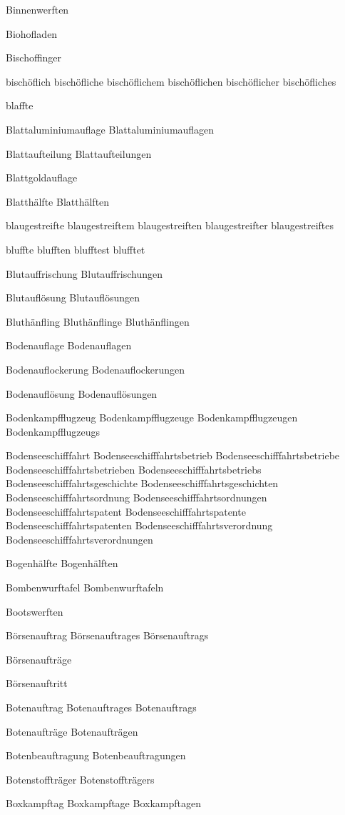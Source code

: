 Binnenwerften

Biohofladen

Bischoffinger

bischöflich
bischöfliche
bischöflichem
bischöflichen
bischöflicher
bischöfliches

blaffte

Blattaluminiumauflage
Blattaluminiumauflagen

Blattaufteilung
Blattaufteilungen

Blattgoldauflage

Blatthälfte
Blatthälften

blaugestreifte
blaugestreiftem
blaugestreiften
blaugestreifter
blaugestreiftes

bluffte
blufften
blufftest
blufftet

Blutauffrischung
Blutauffrischungen

Blutauflösung
Blutauflösungen

Bluthänfling
Bluthänflinge
Bluthänflingen

Bodenauflage
Bodenauflagen

Bodenauflockerung
Bodenauflockerungen

Bodenauflösung
Bodenauflösungen

Bodenkampfflugzeug
Bodenkampfflugzeuge
Bodenkampfflugzeugen
Bodenkampfflugzeugs

Bodenseeschifffahrt
Bodenseeschifffahrtsbetrieb
Bodenseeschifffahrtsbetriebe
Bodenseeschifffahrtsbetrieben
Bodenseeschifffahrtsbetriebs
Bodenseeschifffahrtsgeschichte
Bodenseeschifffahrtsgeschichten
Bodenseeschifffahrtsordnung
Bodenseeschifffahrtsordnungen
Bodenseeschifffahrtspatent
Bodenseeschifffahrtspatente
Bodenseeschifffahrtspatenten
Bodenseeschifffahrtsverordnung
Bodenseeschifffahrtsverordnungen

Bogenhälfte
Bogenhälften

Bombenwurftafel
Bombenwurftafeln

Bootswerften

Börsenauftrag
Börsenauftrages
Börsenauftrags

Börsenaufträge

Börsenauftritt

Botenauftrag
Botenauftrages
Botenauftrags

Botenaufträge
Botenaufträgen

Botenbeauftragung
Botenbeauftragungen

Botenstoffträger
Botenstoffträgers

Boxkampftag
Boxkampftage
Boxkampftagen

